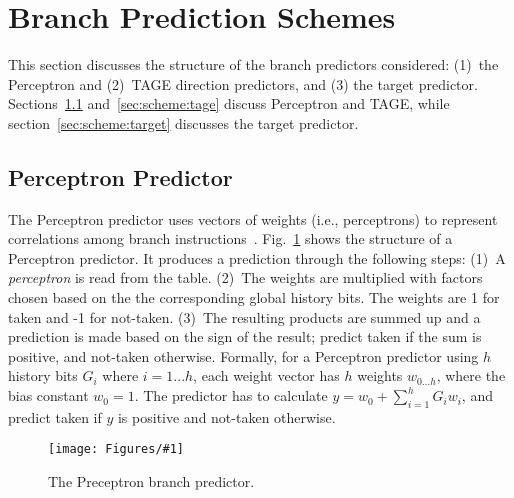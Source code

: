 \documentclass[conference]{IEEEtran}
\newcommand{\kfig}[4]{ %
        \begin{figure}[!t]
        \centering
        \texttt{[image: Figures/\#1]}
        \vspace{-1mm}
        \caption{#3}
        \label{#2}
        \end{figure}
}
\begin{document}
\section{Branch Prediction Schemes}
\label{sec:scheme}
This section discusses the structure of the branch predictors considered: (1)\ the Perceptron and (2)\ TAGE direction predictors, and (3) the target predictor. Sections~\ref{sec:scheme:perceptron} and~\ref{sec:scheme:tage} discuss Perceptron and TAGE, while section~\ref{sec:scheme:target} discusses the target predictor.

\subsection{Perceptron Predictor}
\label{sec:scheme:perceptron}
The Perceptron predictor uses vectors of weights (i.e., perceptrons) to represent correlations among branch instructions~\cite{perceptron}. Fig.~\ref{fig:perceptron} shows the structure of a Perceptron predictor. It produces a prediction through the following steps: (1)~A \textit{perceptron} is read from the table. (2)~The weights are multiplied with factors chosen based on the the corresponding global history bits. The weights are 1 for taken and -1 for not-taken. (3)~The resulting products are summed up and a prediction is made based on the sign of the result; predict taken if the sum is positive, and not-taken otherwise. Formally, for a Perceptron predictor using $h$ history bits $G_i$ where $i = 1...h$, each weight vector has $h$ weights $w_{0...h}$, where the bias constant $w_0 = 1$. The predictor has to calculate $y = w_0 + \sum_{i=1}^{h} G_iw_i$, and predict taken if $y$ is positive and not-taken otherwise.

\kfig{perceptron.pdf}{fig:perceptron}{The Preceptron branch predictor.}{angle = 0, trim = 1in 3.5in 2in 1.1in, clip, width=0.3\textwidth}
\end{document}
